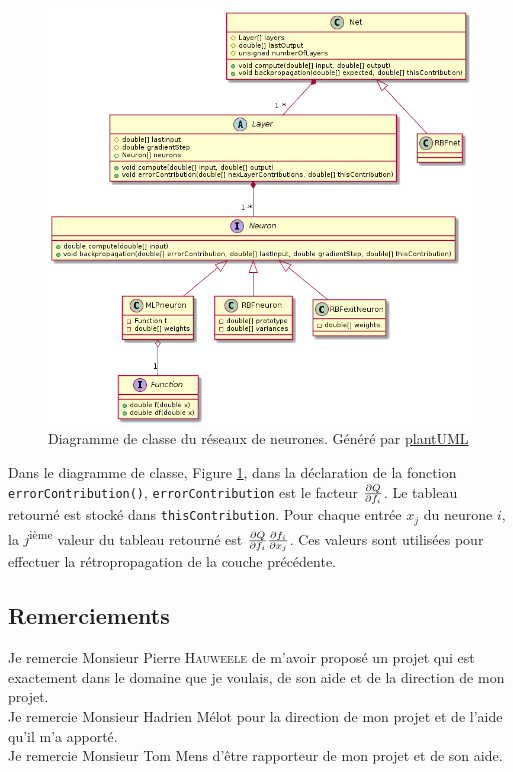 \documentclass[12pt,a4paper,oneside, titlepage]{article}
\begin{document}
\begin{figure}
 \centering
 \includegraphics[width=\textwidth]{../../uml/neurondiag.png}
 \caption{Diagramme de classe du réseaux de neurones. \footnotesize Généré par \href{http://plantuml.com/class-diagram}{plantUML}}
 \label{fig:diagclasse}
\end{figure}
Dans le diagramme de classe, Figure \ref{fig:diagclasse}, dans la déclaration de la fonction \texttt{errorContribution()}, \texttt{errorContribution} est le facteur $\frac{\partial Q}{\partial f_i}$.
Le tableau retourné est stocké dans \texttt{thisContribution}.
Pour chaque entrée $x_j$ du neurone $i$, la $j$\textsuperscript{ième} valeur du tableau retourné est $\frac{\partial Q}{\partial f_i}\frac{\partial f_i}{\partial x_j}$.
Ces valeurs sont utilisées pour effectuer la rétropropagation de la couche précédente.

\newpage

\subsection*{Remerciements}
\noindent Je remercie Monsieur Pierre \textsc{Hauweele} de m'avoir proposé un projet qui est exactement dans le domaine que je voulais, de son aide et de la direction de mon projet.\\

\noindent Je remercie Monsieur Hadrien Mélot pour la direction de mon projet et de l'aide qu'il m'a apporté.\\

\noindent Je remercie Monsieur Tom Mens d'être rapporteur de mon projet et de son aide.\\


\appendix



\end{document}
